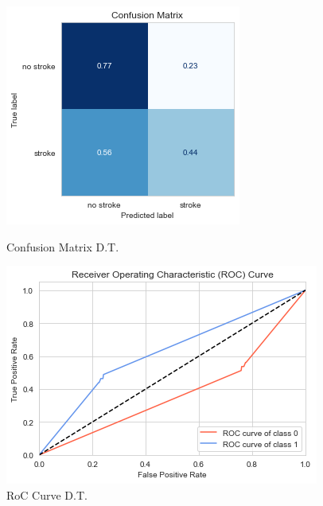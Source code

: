 \documentclass[11pt, a4paper]{article}
\begin{document}


\begin{figure}[H]
    \includegraphics[width=\textwidth]{images/confMatDecTree.png}
    \caption{Confusion Matrix D.T.}
    \label{fig:confMatDecTree}
\endminipage\hfill
{}
    \includegraphics[width=\textwidth]{images/rocDT.png}
    \caption{RoC Curve D.T.}
    \label{fig:RoCDT}
\endminipage\hfill
\end{figure}
\end{document}
